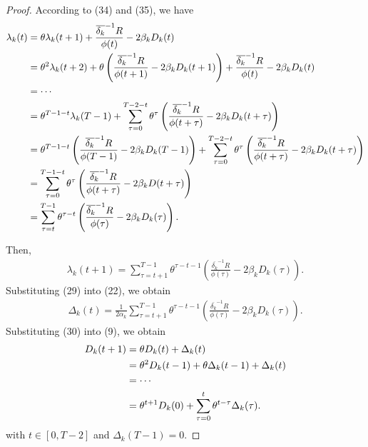 \documentclass{article}
\theoremstyle{plain}
\theoremstyle{definition}
\theoremstyle{remark}
\begin{document}
\begin{proof}
    According to (34) and (35), we have
    \begin{align}
      \lambda_k(t) & = \theta \lambda_k(t+1) + \frac{\overline{\delta_k}^{-1}R}{\phi(t)} - 2\beta_k D_k(t) \notag \\
                  & = \theta^2 \lambda_k(t+2) + \theta\left(\frac{\overline{\delta_k}^{-1}R}{\phi(t+1)} - 2\beta_kD_k(t+1)\right) + \frac{\overline{\delta_k}^{-1}R}{\phi(t)} - 2\beta_kD_k(t) \notag \\
                  & = \cdots \notag \\
                  & = \theta^{T-1-t} \lambda_k(T-1) + \sum_{\tau=0}^{T-2-t} \theta^{\tau} \left(\frac{\overline{\delta_k}^{-1}R}{\phi(t + \tau)} - 2\beta_kD_k(t + \tau)\right) \notag \\
                  & = \theta^{T-1-t} \left(\frac{\overline{\delta_k}^{-1}R}{\phi(T-1)} - 2\beta_k D_k(T-1)\right) + \sum_{\tau=0}^{T-2-t} \theta^{\tau} \left(\frac{\overline{\delta_k}^{-1}R}{\phi(t + \tau)} - 2\beta_k D_k(t + \tau)\right) \notag \\
                  & = \sum_{\tau = 0}^{T - 1 - t} \theta^{\tau} \left(\frac{\overline{\delta_k}^{-1}R}{\phi(t + \tau)} - 2\beta_k D(t + \tau)\right) \notag \\
                  & = \sum_{\tau = t}^{T - 1} \theta^{\tau - t} \left(\frac{\overline{\delta_k}^{-1}R}{\phi(\tau)} - 2\beta_k D_k(\tau)\right).
    \end{align}
  
    Then,
    \begin{align}
      \lambda_k(t+1) = \sum_{\tau = t + 1}^{T - 1} \theta^{\tau - t - 1} \left(\frac{\overline{\delta_k}^{-1}R}{\phi(\tau)} - 2\beta_k D_k(\tau)\right).
    \end{align}
    Substituting (29) into (22), we obtain
    \begin{align}
      \Delta_k(t) = \frac{1}{2 \alpha_k} \sum_{\tau = t + 1}^{T - 1} \theta^{\tau - t - 1} \left(\frac{\overline{\delta_k}^{-1}R}{\phi(\tau)} - 2\beta_k D_k(\tau)\right).
    \end{align}
    Substituting (30) into (9), we obtain
    \begin{align}
      D_k(t+1) & = \theta D_k(t) + \Delta_k(t) \notag \\
            & = \theta^2 D_k(t-1) + \theta \Delta_k(t-1) + \Delta_k(t) \notag \\
            & = \cdots \notag \\
            & = \theta^{t+1} D_k(0) + \sum_{\tau = 0}^{t} \theta^{t-\tau} \Delta_k(\tau).
    \end{align}
    with $t \in [0, T-2]$ and $\Delta_k(T-1) = 0$.
  \end{proof}
\end{document}
